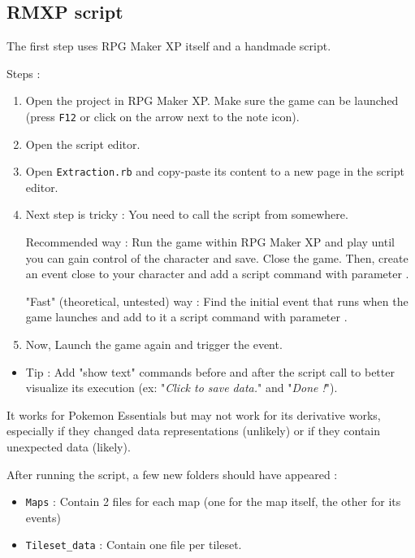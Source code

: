 \documentclass[11pt]{article}
\begin{document}
\newpage
\subsection{RMXP script}

The first step uses RPG Maker XP itself and a handmade script.

Steps :
\begin{enumerate}
	\item Open the project in RPG Maker XP. Make sure the game can be launched (press \verb|F12| or click on the arrow next to the note icon).
	
	\item Open the script editor.
	
	\item Open \verb|Extraction.rb| and copy-paste its content to a new page in the script editor.
	
	\item Next step is tricky : You need to call the script from somewhere. 
	
	Recommended way : Run the game within RPG Maker XP and play until you can gain control of the character and save. Close the game. Then, create an event close to your character and add a script command with parameter . 
	
	"Fast" (theoretical, untested) way : Find the initial event that runs when the game launches and add to it a script command with parameter .
	
	\item Now, Launch the game again and trigger the event.
\end{enumerate}

\begin{itemize}
	\item Tip : Add "show text" commands before and after the script call to better visualize its execution (ex: "\textit{Click to save data.}" and "\textit{Done !}").
\end{itemize}

It works for Pokemon Essentials but may not work for its derivative works, especially if they changed data representations (unlikely) or if they contain unexpected data (likely).

After running the script, a few new folders should have appeared :
\begin{itemize}
	\item \verb|Maps| : Contain 2 files for each map (one for the map itself, the other for its events)
	\item \verb|Tileset_data| : Contain one file per tileset.
\end{itemize}
\end{document}
